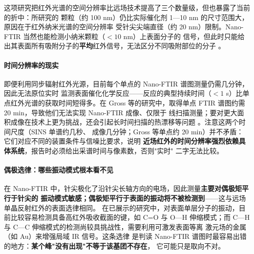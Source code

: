 这项研究把红外光谱的空间分辨率比远场技术提高了三个数量级，但也暴露了当前的折中：所研究的
颗粒（约 100 nm）仍比实际催化剂 1—10 nm 的尺寸范围大，原因在于红外纳米光谱的空间分辨率
受针尖尖端直径（约 20 nm）限制。Nano-FTIR 当然也能检测小纳米颗粒（$<10$ nm）上表面分子的
信号，但此时只能给出其表面所有吸附分子的\textbf{平均}红外信号，无法区分不同吸附部位的分子
。

\paragraph{时间分辨率的现实}
即便利用同步辐射红外光源，目前每个单点的 Nano-FTIR 谱图测量仍需几分钟，因此无法原位实时
监测表面催化化学反应——反应的典型持续时间（$<1$ s）比单点红外光谱的获取时间短得多。在
Gross 等的研究中，取得单点 FTIR 谱图约需 20 min，导致他们无法实现 Nano-FTIR 成像、仅限于
线扫描测量；要对更大面积成像在技术上更为挑战，还会引起长时间扫描的热漂移等问题
。注意这两个时间尺度（SINS 单谱约几秒、
成像几分钟；Gross 等单点约 20 min）并不矛盾：它们对应不同的装置条件与信噪比要求，说明
\textbf{近场红外的时间分辨率强烈依赖具体系统}，报告时必须给出采谱时间与像素数，否则"实时"
二字无法比较。

\paragraph{偶极选律：哪些振动模式根本看不见}
在 Nano-FTIR 中，针尖极化了沿针尖长轴方向的电场，因此测量\textbf{主要对偶极矩平行于针尖的
振动模式敏感；偶极矩平行于表面的振动将不被检测到}——这与远场单晶反射红外的表面选律相同。
在已展示的研究中，对表面单层分子的振动，目前比较容易检测具备高红外吸收截面的键，如
C=O 与 O—H 伸缩模式；而 C—H 与 C—C 伸缩模式的检测尚较具挑战性，需要利用可激发表面等离
激元场的金属（如 Au）来增强局域 IR 信号。这条选律
是判读 Nano-FTIR 谱图时最容易出错的地方：\textbf{某个峰"没有出现"不等于该基团不存在}，
它可能只是取向不对。

